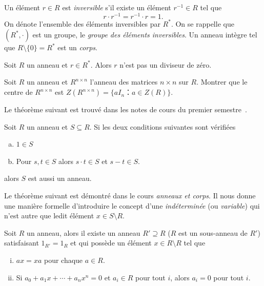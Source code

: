 Un élément $r ∈R$ est \emph{inversible} s'il existe un élément $r^{-1} ∈ R$ tel que
\begin{displaymath}
  r ⋅ r^{-1} = r^{-1} ⋅r = 1. 
\end{displaymath}
On dénote l'ensemble des éléments inversibles par $R^*$. On se rappelle que $(R^*, ⋅)$ est un groupe, le \emph{groupe des éléments inversibles}. Un anneau intègre tel que $R \setminus \{0\} = R^*$ est un \emph{corps}. 

\begin{exercise}
  \label{exe:39}
  Soit $R$ un anneau et $r ∈ R^*$. Alors $r$ n'est pas un diviseur de zéro. 
\end{exercise}

\begin{exercise}
  \label{exe:42}
  Soit $R$ un anneau et $R^{n ×n}$ l'anneau des matrices $n ×n$ sur $R$. Montrer que le centre de $R^{n ×n}$ est $Z(R^{n ×n}) = \{ a I_n ：a ∈Z(R)\}$. 
\end{exercise}


Le théorème suivant est trouvé dans les notes de cours du premier semestre~\cite{PMichel2026}.
\begin{theorem}
  \label{thr:58}
  Soit $R$ un anneau et $S ⊆R$. Si les deux conditions suivantes sont vérifiées 
  \begin{enumerate}[a)]
  \item $1 ∈ S$ \label{item:27}
  \item Pour $s,t ∈S$ alors  $s⋅t∈S$   et $s-t ∈S$. \label{item:28}
  \end{enumerate} 
  alors $S$ est aussi un anneau. 
\end{theorem}


Le théorème suivant est démontré dans le cours \emph{anneaux et corps}.   Il nous donne une manière formelle d'introduire le concept d'une \emph{indéterminée} (ou  \emph{variable}) qui n'est autre que ledit élément $x ∈ S \setminus R$.
\begin{theorem}
  \label{thr:50}
  Soit $R$ un anneau, alors il existe un anneau $R' ⊇R$ ($R$ est un
  sous-anneau de $R'$) satisfaisant $1_{R'} = 1_R$ et qui possède un élément
  $x ∈ R \setminus R$ tel que
  \begin{enumerate}[(i)]
   
  \item $a x = x a $ pour chaque $a ∈ R$. \label{item:29}
  \item Si 
    $  a_0+ a_1x + \cdots + a_n x^n =0$  et $a_i ∈R$ pour tout $i$,  
    alors  $a_i = 0$ pour tout $i$. \label{item:30}
  \end{enumerate}
\end{theorem}
  

